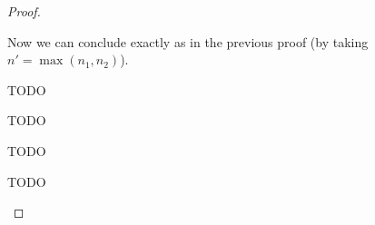 \documentclass[a4paper]{article}
\theoremstyle{definition}
\begin{document}
\begin{proof}
\begin{description}
\begin{description}
        Now we can conclude exactly as in the previous proof (by taking $n'=\max (n_1,n_2)$).
        \item[\Rule{PPairL}] TODO%
        \item[\Rule{PPairR}] TODO%
        \item[\Rule{PFst}] TODO%
        \item[\Rule{PSnd}] TODO%
      \end{description}
    \end{description}
  \end{proof}
\end{document}
